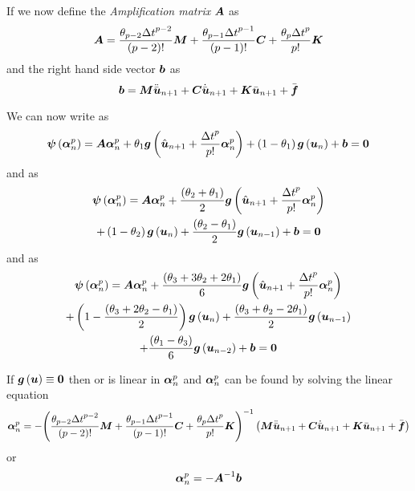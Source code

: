If we now define the \emph{Amplification matrix} $\matr{A}$ as
\begin{equation}
  \matr{A}=\dfrac{\theta_{p-2}{\Delta t}^{p-2}}{\factorial{p-2}}\matr{M}+
  \dfrac{\theta_{p-1}{\Delta t}^{p-1}}{\factorial{p-1}}\matr{C}+
  \dfrac{\theta_{p}{\Delta t}^{p}}{p!}\matr{K}
\end{equation}
and the right hand side vector $\boldsymbol{b}$ as
\begin{equation}
  \vectr{b}=\matr{M}\ddot{\bar{\vectr{u}}}_{n+1}+\matr{C}\dot{\bar{\vectr{u}}}_{n+1}+
  \matr{K}\bar{\vectr{u}}_{n+1}+\bar{\vectr{f}}
\end{equation}

We can now write  as
\begin{equation}
\fnof{\vectr{\psi}}{\vectr{\alpha}^{p}_{n}}=\matr{A}\vectr{\alpha}^{p}_{n}+
\theta_{1}\fnof{\vectr{g}}{\hat{\vectr{u}}_{n+1}+ \dfrac{{\Delta
      t}^{p}}{p!}\vectr{\alpha}^{p}_{n}}+\pbrac{1-\theta_{1}}\fnof{\vectr{g}}{\vectr{u}_{n}}+\vectr{b}= \vectr{0}
\end{equation}
and  as
\begin{multline}
\fnof{\vectr{\psi}}{\vectr{\alpha}^{p}_{n}}=\matr{A}\vectr{\alpha}^{p}_{n}+
\dfrac{\pbrac{\theta_{2}+\theta_{1}}}{2}\fnof{\vectr{g}}{\hat{\vectr{u}}_{n+1}
  +\dfrac{{\Delta t}^{p}}{p!}\vectr{\alpha}^{p}_{n}} \\
+\pbrac{1-\theta_{2}}\fnof{\vectr{g}}{\vectr{u}_{n}}+
\dfrac{\pbrac{\theta_{2}-\theta_{1}}}{2}\fnof{\vectr{g}}{\vectr{u}_{n-1}}+\vectr{b}=\vectr{0}
\end{multline}
and  as
\begin{multline}
\fnof{\vectr{\psi}}{\vectr{\alpha}^{p}_{n}}=\matr{A}\vectr{\alpha}^{p}_{n}+
\dfrac{\pbrac{\theta_{3}+3\theta_{2}+2\theta_{1}}}{6}\fnof{\vectr{g}}{\hat{\vectr{u}}_{n+1}
  +\dfrac{{\Delta t}^{p}}{p!}\vectr{\alpha}^{p}_{n}} \\
+\pbrac{1-\dfrac{\pbrac{\theta_{3}+2\theta_{2}-\theta_{1}}}{2}}\fnof{\vectr{g}}{\vectr{u}_{n}}
+\dfrac{\pbrac{\theta_{3}+\theta_{2}-2\theta_{1}}}{2}\fnof{\vectr{g}}{\vectr{u}_{n-1}} \\
+\dfrac{\pbrac{\theta_{1}-\theta_{3}}}{6}\fnof{\vectr{g}}{\vectr{u}_{n-2}}
+\vectr{b}=\vectr{0}
\end{multline}

If $ \boldsymbol{g}\left( \boldsymbol{u} \right) \equiv\boldsymbol{0}$ then
 or  is linear in
$\boldsymbol{\alpha}^{p}_{n}$ and $\boldsymbol{\alpha}^{p}_{n}$ can be found by solving
the linear equation
\begin{equation}
  \vectr{\alpha}^{p}_{n} =-\inverse{\pbrac{\dfrac{\theta_{p-2}{\Delta t}^{p-2}}{\factorial{p-2}}\matr{M}+
      \dfrac{\theta_{p-1}{\Delta t}^{p-1}}{\factorial{p-1}}\matr{C}+
      \dfrac{\theta_{p}{\Delta
          t}^{p}}{p!}\matr{K}}}\pbrac{\matr{M}\ddot{\bar{\vectr{u}}}_{n+1}+
    \matr{C}\dot{\bar{\vectr{u}}}_{n+1}+\matr{K}\bar{\vectr{u}}_{n+1}+\bar{\vectr{f}}}
\end{equation}
or 
\begin{equation}
  \vectr{\alpha}^{p}_{n} =-\inverse{\matr{A}}\vectr{b}
\end{equation}

